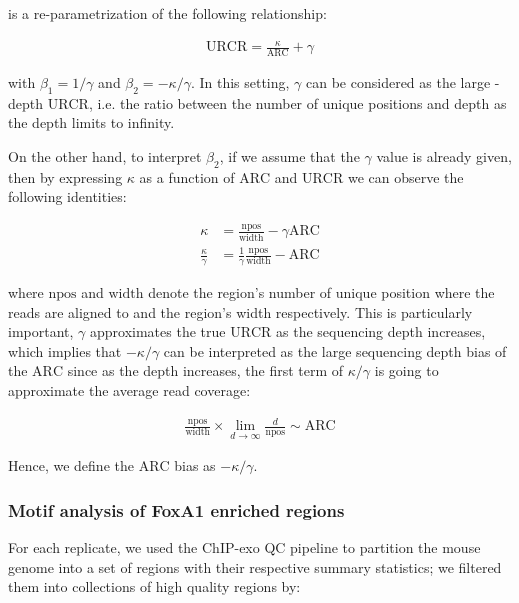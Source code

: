 \documentclass{bmcart}\usepackage[]{graphicx}\usepackage[]{color}
\begin{document}
is a re-parametrization of the following relationship:

\begin{align}
  \mbox{URCR} = \frac{\kappa}{\mbox{ARC}} + \gamma
\label{mod}
\end{align}

with $\beta_1 = 1 / \gamma$ and $\beta_2 = - \kappa / \gamma$. In this
setting, $\gamma$ can be considered as the large - depth
$\mbox{URCR}$, i.e. the ratio between the number of unique positions
and depth as the depth limits to infinity.

On the other hand, to interpret $\beta_2$, if we assume that the
$\gamma$ value is already given, then by expressing $\kappa$ as a
function of $\mbox{ARC}$ and $\mbox{URCR}$ we can observe the
following identities:

\begin{align*}
  \kappa &= \frac{\mbox{npos}}{\mbox{width}} - \gamma \mbox{ARC} \\
  \frac{\kappa}{\gamma} &= \frac{1}{\gamma} \frac{\mbox{npos}}{\mbox{width}} - \mbox{ARC} 
\end{align*}

where $\mbox{npos}$ and $\mbox{width}$ denote the region's number of
unique position where the reads are aligned to and the region's width
respectively. This is particularly important, $\gamma$ approximates
the true $\mbox{URCR}$ as the sequencing depth increases, which
implies that $- \kappa / \gamma$ can be interpreted as the large
sequencing depth bias of the $\mbox{ARC}$ since as the depth
increases, the first term of $\kappa / \gamma$ is going to approximate
the average read coverage:

\begin{align*}
  \frac{\mbox{npos}}{\mbox{width}} \times \lim_{d \rightarrow
    \infty} \frac{d }{\mbox{npos}} \sim \mbox{ARC}
\end{align*}

Hence, we define the $\mbox{ARC}$ bias as $- \kappa / \gamma$.


\subsubsection*{Motif analysis of FoxA1 enriched regions}

For each replicate, we used the ChIP-exo QC pipeline to partition the
mouse genome into a set of regions with their respective summary
statistics; we filtered them into collections of high quality regions
by:
\end{document}
